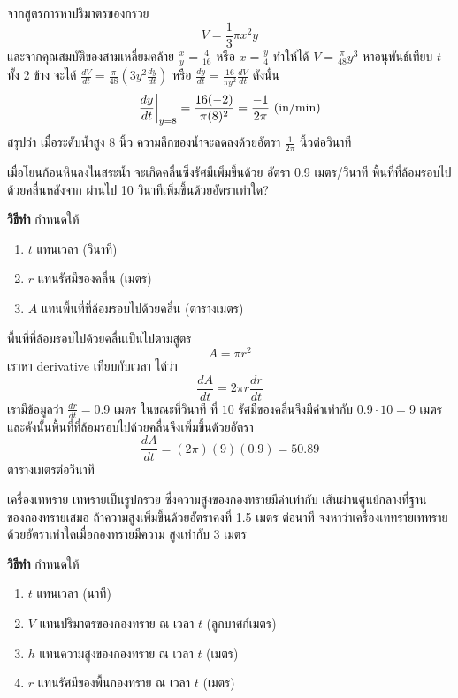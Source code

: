 \documentclass[
]{book}
\begin{document}
จากสูตรการหาปริมาตรของกรวย \[V=\frac{1}{3}\pi x^2 y\]
และจากคุณสมบัติของสามเหลี่ยมคล้าย \(\displaystyle \frac{x}{y}=\frac{4}{16}\)
หรือ \(\displaystyle x=\frac{y}{4}\) ทำให้ได้
\(\displaystyle V=\frac{\pi}{48} y^3\) หาอนุพันธ์เทียบ \(t\) ทั้ง 2 ข้าง จะได้
\(\displaystyle \frac{dV}{dt}=\frac{\pi}{48} (3y^2 \frac{dy}{dt})\) หรือ
\(\displaystyle \frac{dy}{dt}=\frac{16}{\pi y^2} \frac{dV}{dt}\) ดังนั้น
\[\displaystyle \frac{dy}{dt}\bigg{|}_{y=8} = \frac{16(-2)}{\pi(8)^2} = \frac{-1}{2\pi} \text{ (in/min)}\]
สรุปว่า เมื่อระดับน้ำสูง 8 นิ้ว ความลึกของน้ำจะลดลงด้วยอัตรา
\(\displaystyle \frac{1}{2\pi}\) นิ้วต่อวินาที

เมื่อโยนก้อนหินลงในสระน้ำ จะเกิดคลื่นซึ่งรัศมีเพิ่มขึ้นด้วย อัตรา 0.9 เมตร/วินาที
พื้นที่ที่ล้อมรอบไปด้วยคลื่นหลังจาก ผ่านไป 10 วินาทีเพิ่มขึ้นด้วยอัตราเท่าใด?

\textbf{วิธีทำ} กำหนดให้

\begin{enumerate}
\def\labelenumi{\arabic{enumi}.}
\item
  \(t\) แทนเวลา (วินาที)
\item
  \(r\) แทนรัศมีของคลื่น (เมตร)
\item
  \(A\) แทนพื้นที่ที่ล้อมรอบไปด้วยคลื่น (ตารางเมตร)
\end{enumerate}

พื้นที่ที่ล้อมรอบไปด้วยคลื่นเป็นไปตามสูตร \[A = \pi r^2\] เราหา derivative
เทียบกับเวลา ได้ว่า \[\frac{dA}{dt} = 2\pi r\frac{dr}{dt}\] เรามีข้อมูลว่า
\(\frac{dr}{dt} = 0.9\) เมตร ในขณะที่วินาที ที่ \(10\) รัศมีของคลื่นจึงมีค่าเท่ากับ
\(0.9\cdot 10 = 9\) เมตร และดังนั้นพื้นที่ที่ล้อมรอบไปด้วยคลื่นจึงเพิ่มขึ้นด้วยอัตรา
\[\frac{dA}{dt} = (2\pi)(9)(0.9) = 50.89\] ตารางเมตรต่อวินาที

เครื่องเททราย เททรายเป็นรูปกรวย ซึ่งความสูงของกองทรายมีค่าเท่ากับ
เส้นผ่านศูนย์กลางที่ฐานของกองทรายเสมอ ถ้าความสูงเพิ่มขึ้นด้วยอัตราคงที่ 1.5 เมตร ต่อนาที
จงหาว่าเครื่องเททรายเททรายด้วยอัตราเท่าใดเมื่อกองทรายมีความ สูงเท่ากับ 3 เมตร

\textbf{วิธีทำ} กำหนดให้

\begin{enumerate}
\def\labelenumi{\arabic{enumi}.}
\item
  \(t\) แทนเวลา (นาที)
\item
  \(V\) แทนปริมาตรของกองทราย ณ เวลา \(t\) (ลูกบาศก์เมตร)
\item
  \(h\) แทนความสูงของกองทราย ณ เวลา \(t\) (เมตร)
\item
  \(r\) แทนรัศมีของพื้นกองทราย ณ เวลา \(t\) (เมตร)
\end{enumerate}
\end{document}
